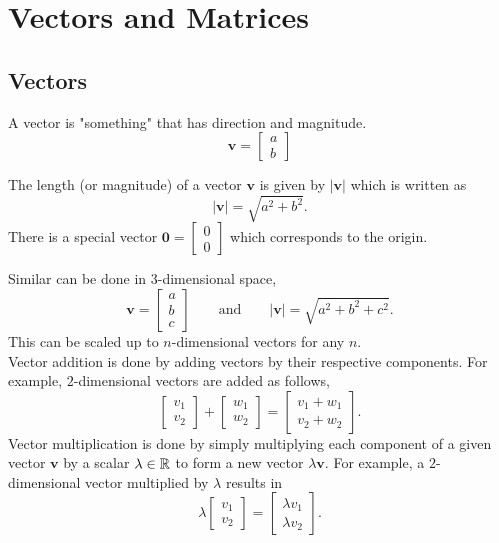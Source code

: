 \documentclass[10pt, a4paper]{article}
\begin{document}
\newpage

\section{Vectors and Matrices}

\subsection{Vectors}
A vector is "something" that has direction and magnitude.
\[
\mathbf{v} = 
\begin{bmatrix}
   a \\
   b
\end{bmatrix}
\]

The length (or magnitude) of a vector $\mathbf{v}$ is given by $|\mathbf{v}|$ which is written as
\[
|\mathbf{v}| = \sqrt{a ^ 2 + b ^ 2}.
\]
There is a special vector ${\mathbf{0}}=\begin{bmatrix} 0 \\ 0 \end{bmatrix}$ which corresponds to the origin.

Similar can be done in $3$-dimensional space,
\[
\mathbf{v} = 
\begin{bmatrix}
a \\
b \\
c
\end{bmatrix}
\qquad\text{and}\qquad|\mathbf{v}| = \sqrt{a ^ 2 + b ^ 2 + c ^ 2}.
\]
This can be scaled up to $n$-dimensional vectors for any $n$. \\

Vector addition is done by adding vectors by their respective components. For example, $2$-dimensional vectors are added as follows,
\[
\begin{bmatrix} v_1 \\ v_2 \end{bmatrix} + \begin{bmatrix} w_1 \\ w_2 \end{bmatrix} = \begin{bmatrix} v_1 + w_1 \\ v_2 + w_2 \end{bmatrix}.
\]
Vector multiplication is done by simply multiplying each component of a given vector $\mathbf{v}$ by a scalar $\lambda \in \mathbb{R}$ to form a new vector $\lambda\mathbf{v}$. For example, a $2$-dimensional vector multiplied by $\lambda$ results in
\[
\lambda\begin{bmatrix} v_1 \\ v_2 \end{bmatrix} = \begin{bmatrix} \lambda v_1 \\ \lambda v_2 \end{bmatrix}.
\]
\end{document}
